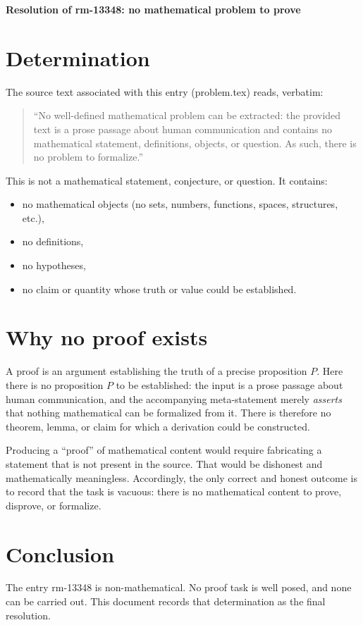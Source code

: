 \documentclass{amsart}
\begin{document}
\begin{center}
\textbf{Resolution of rm-13348: no mathematical problem to prove}
\end{center}

\section*{Determination}

The source text associated with this entry (problem.tex) reads, verbatim:

\begin{quote}
``No well-defined mathematical problem can be extracted: the provided text
is a prose passage about human communication and contains no mathematical
statement, definitions, objects, or question. As such, there is no problem
to formalize.''
\end{quote}

This is not a mathematical statement, conjecture, or question. It contains:
\begin{itemize}
  \item no mathematical objects (no sets, numbers, functions, spaces,
        structures, etc.),
  \item no definitions,
  \item no hypotheses,
  \item no claim or quantity whose truth or value could be established.
\end{itemize}

\section*{Why no proof exists}

A proof is an argument establishing the truth of a precise proposition $P$.
Here there is no proposition $P$ to be established: the input is a prose
passage about human communication, and the accompanying meta-statement merely
\emph{asserts} that nothing mathematical can be formalized from it. There is
therefore no theorem, lemma, or claim for which a derivation could be
constructed.

Producing a ``proof'' of mathematical content would require fabricating a
statement that is not present in the source. That would be dishonest and
mathematically meaningless. Accordingly, the only correct and honest outcome
is to record that the task is vacuous: there is no mathematical content to
prove, disprove, or formalize.

\section*{Conclusion}

The entry rm-13348 is non-mathematical. No proof task is well posed, and none
can be carried out. This document records that determination as the final
resolution.
\end{document}
